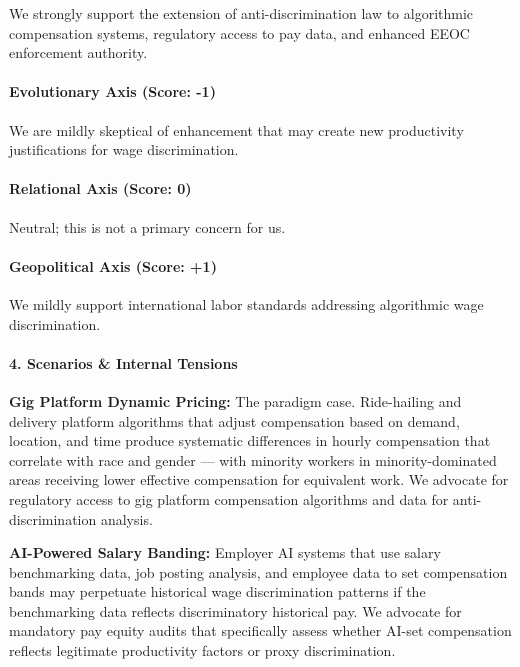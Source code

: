 We strongly support the extension of anti-discrimination law to
algorithmic compensation systems, regulatory access to pay data, and
enhanced EEOC enforcement authority.

\paragraph{Evolutionary Axis (Score:
-1)}\label{evolutionary-axis-score--1-7}

We are mildly skeptical of enhancement that may create new productivity
justifications for wage discrimination.

\paragraph{Relational Axis (Score: 0)}\label{relational-axis-score-0-3}

Neutral; this is not a primary concern for us.

\paragraph{Geopolitical Axis (Score:
+1)}\label{geopolitical-axis-score-1-4}

We mildly support international labor standards addressing algorithmic
wage discrimination.

\paragraph{4. Scenarios \& Internal
Tensions}\label{scenarios-internal-tensions-42}

\textbf{Gig Platform Dynamic Pricing:} The paradigm case. Ride-hailing
and delivery platform algorithms that adjust compensation based on
demand, location, and time produce systematic differences in hourly
compensation that correlate with race and gender --- with minority
workers in minority-dominated areas receiving lower effective
compensation for equivalent work. We advocate for regulatory access to
gig platform compensation algorithms and data for anti-discrimination
analysis.

\textbf{AI-Powered Salary Banding:} Employer AI systems that use salary
benchmarking data, job posting analysis, and employee data to set
compensation bands may perpetuate historical wage discrimination
patterns if the benchmarking data reflects discriminatory historical
pay. We advocate for mandatory pay equity audits that specifically
assess whether AI-set compensation reflects legitimate productivity
factors or proxy discrimination.

